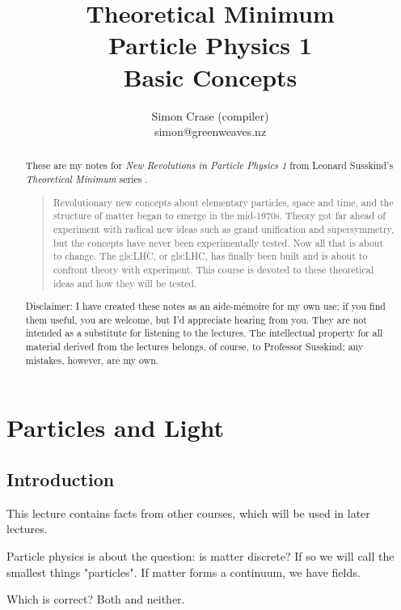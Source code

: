 \documentclass[]{article}
\title{Theoretical Minimum\\Particle Physics 1\\Basic Concepts}
\author{Simon Crase (compiler)\\simon@greenweaves.nz}
\begin{document}
\maketitle

\begin{abstract}
These are my notes for \emph{New Revolutions in Particle Physics 1}  from Leonard Susskind's \emph{Theoretical Minimum} series \cite[Particle Physics 1: Basic Concepts]{susskind2007theoretical}.

\begin{quotation}
	Revolutionary new concepts about elementary particles, space and time, and the structure of matter began to emerge in the mid-1970s. Theory got far ahead of experiment with radical new ideas such as grand unification and supersymmetry, but the concepts have never been experimentally tested. Now all that is about to change. The \glsdesc{gls:LHC}, or \gls{gls:LHC}, has finally been built and is about to confront theory with experiment. This course is devoted to these theoretical ideas and how they will be tested.
\end{quotation}

Disclaimer: I have created these notes as an aide-m\'emoire for my own use; if you find them useful, you are welcome, but I'd appreciate hearing from you. They are not intended as a substitute for listening to the lectures. The intellectual property for all material derived from the lectures belongs, of course, to Professor Susskind; any mistakes, however, are my own.

\end{abstract}

\tableofcontents
\listoffigures
\listoftables
\listoftheorems

\section{Particles and Light}

\subsection{Introduction}
This lecture contains  facts from other courses, which will be used in later lectures.

Particle physics is about the question: is matter discrete? If so we will call the smallest things "particles". If matter forms a continuum, we have fields.

Which is correct? Both and neither.
\end{document}
